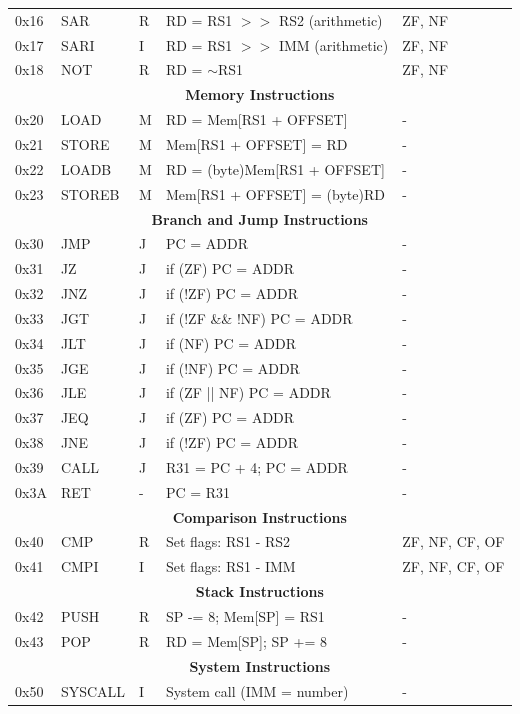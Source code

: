 \documentclass[12pt,a4paper,oneside]{book}
\begin{document}
\begin{table}[H]
\begin{tabularx}{\textwidth}{|l|l|l|X|l|}
0x16 & SAR & R & RD = RS1 $>>$ RS2 (arithmetic) & ZF, NF \\
0x17 & SARI & I & RD = RS1 $>>$ IMM (arithmetic) & ZF, NF \\
0x18 & NOT & R & RD = $\sim$RS1 & ZF, NF \\
\hline
\multicolumn{5}{|c|}{\textbf{Memory Instructions}} \\
\hline
0x20 & LOAD & M & RD = Mem[RS1 + OFFSET] & - \\
0x21 & STORE & M & Mem[RS1 + OFFSET] = RD & - \\
0x22 & LOADB & M & RD = (byte)Mem[RS1 + OFFSET] & - \\
0x23 & STOREB & M & Mem[RS1 + OFFSET] = (byte)RD & - \\
\hline
\multicolumn{5}{|c|}{\textbf{Branch and Jump Instructions}} \\
\hline
0x30 & JMP & J & PC = ADDR & - \\
0x31 & JZ & J & if (ZF) PC = ADDR & - \\
0x32 & JNZ & J & if (!ZF) PC = ADDR & - \\
0x33 & JGT & J & if (!ZF \&\& !NF) PC = ADDR & - \\
0x34 & JLT & J & if (NF) PC = ADDR & - \\
0x35 & JGE & J & if (!NF) PC = ADDR & - \\
0x36 & JLE & J & if (ZF || NF) PC = ADDR & - \\
0x37 & JEQ & J & if (ZF) PC = ADDR & - \\
0x38 & JNE & J & if (!ZF) PC = ADDR & - \\
0x39 & CALL & J & R31 = PC + 4; PC = ADDR & - \\
0x3A & RET & - & PC = R31 & - \\
\hline
\multicolumn{5}{|c|}{\textbf{Comparison Instructions}} \\
\hline
0x40 & CMP & R & Set flags: RS1 - RS2 & ZF, NF, CF, OF \\
0x41 & CMPI & I & Set flags: RS1 - IMM & ZF, NF, CF, OF \\
\hline
\multicolumn{5}{|c|}{\textbf{Stack Instructions}} \\
\hline
0x42 & PUSH & R & SP -= 8; Mem[SP] = RS1 & - \\
0x43 & POP & R & RD = Mem[SP]; SP += 8 & - \\
\hline
\multicolumn{5}{|c|}{\textbf{System Instructions}} \\
\hline
0x50 & SYSCALL & I & System call (IMM = number) & - \\
\hline
\end{tabularx}
\end{table}
\end{document}
